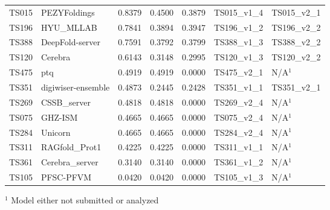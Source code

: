 \begin{table}[ht]
{\begin{tabular}{llrrrll}
TS015 & PEZYFoldings & 0.8379 & 0.4500 & 0.3879 & TS015\_v1\_4 & TS015\_v2\_1 \\ 
TS196 & HYU\_MLLAB & 0.7841 & 0.3894 & 0.3947 & TS196\_v1\_2 & TS196\_v2\_2 \\ 
TS388 & DeepFold-server & 0.7591 & 0.3792 & 0.3799 & TS388\_v1\_3 & TS388\_v2\_2 \\ 
TS120 & Cerebra & 0.6143 & 0.3148 & 0.2995 & TS120\_v1\_3 & TS120\_v2\_2 \\ 
TS475 & ptq & 0.4919 & 0.4919 & 0.0000 & TS475\_v2\_1 & N/A$^{1}$ \\ 
TS351 & digiwiser-ensemble & 0.4873 & 0.2445 & 0.2428 & TS351\_v1\_1 & TS351\_v2\_1 \\ 
TS269 & CSSB\_server & 0.4818 & 0.4818 & 0.0000 & TS269\_v2\_4 & N/A$^{1}$ \\ 
TS075 & GHZ-ISM & 0.4665 & 0.4665 & 0.0000 & TS075\_v2\_4 & N/A$^{1}$ \\ 
TS284 & Unicorn & 0.4665 & 0.4665 & 0.0000 & TS284\_v2\_4 & N/A$^{1}$ \\ 
TS311 & RAGfold\_Prot1 & 0.4225 & 0.4225 & 0.0000 & TS311\_v1\_1 & N/A$^{1}$ \\ 
TS361 & Cerebra\_server & 0.3140 & 0.3140 & 0.0000 & TS361\_v1\_2 & N/A$^{1}$ \\ 
TS105 & PFSC-PFVM & 0.0420 & 0.0420 & 0.0000 & TS105\_v1\_3 & N/A$^{1}$ \\ 
\bottomrule
\end{tabular}%
}
\begin{flushleft}\footnotesize $^{1}$ Model either not submitted or analyzed\end{flushleft}
\end{table}
